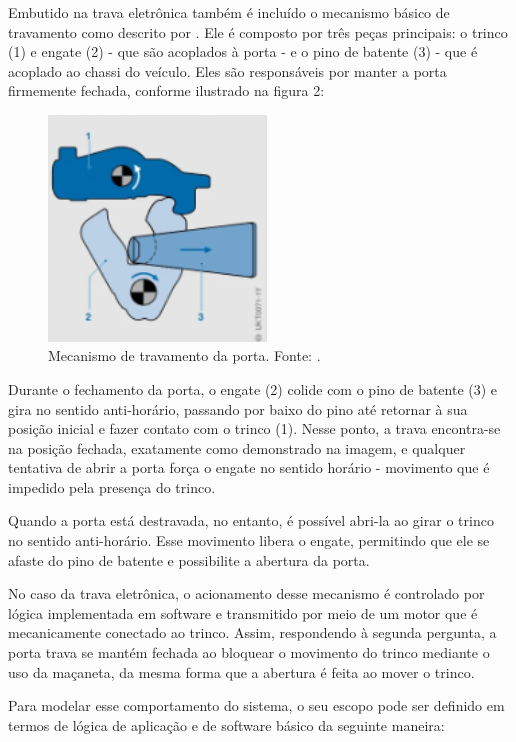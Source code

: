 Embutido na trava eletrônica também é incluído o mecanismo básico de travamento como descrito por . Ele é composto por três peças principais: 
o trinco (1) e engate (2) - que são acoplados à porta - e  o pino de batente (3) - que é acoplado ao chassi do veículo. Eles são responsáveis por manter a porta 
firmemente fechada, conforme ilustrado na figura 2:

\begin{figure}[H]
\centering
\includegraphics[height=6cm]{figuras/trava_mecanismo.png}
\caption{Mecanismo de travamento da porta. Fonte: \cite{reif2017locking}.}
\label{fig:travaporta}
\end{figure}

Durante o fechamento da porta, o engate (2) colide com o pino de batente (3) e gira no sentido anti-horário, passando por baixo do pino até retornar à sua posição 
inicial e fazer contato com o trinco (1). Nesse ponto, a trava encontra-se na posição fechada, exatamente como demonstrado na imagem, e qualquer tentativa de abrir 
a porta força o engate no sentido horário - movimento que é impedido pela presença do trinco.

Quando a porta está destravada, no entanto, é possível abri-la ao girar o trinco no sentido anti-horário. Esse movimento libera o engate, permitindo que ele se 
afaste do pino de batente e possibilite a abertura da porta.

No caso da trava eletrônica, o acionamento desse mecanismo é controlado por lógica implementada em software e transmitido por meio de um motor que é mecanicamente 
conectado ao trinco. Assim, respondendo à segunda pergunta, a porta trava se mantém fechada ao bloquear o movimento do trinco mediante o uso da maçaneta, da mesma 
forma que a abertura é feita ao mover o trinco.

Para modelar esse comportamento do sistema, o seu escopo pode ser definido em termos de lógica de aplicação e de software básico da seguinte maneira:

